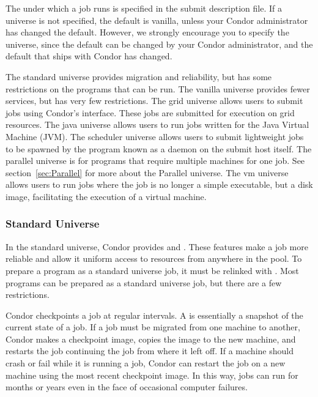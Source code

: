 The  under which a job runs
is specified in the submit description file.
If a universe is not specified,
the default is vanilla,
unless your Condor administrator has changed the default.
However, we strongly encourage you to specify the universe,
since the default can be changed by your Condor administrator,
and the default that ships with Condor has changed.

The standard universe provides migration and reliability, but has some
restrictions on the programs that can be run. 
The vanilla universe provides fewer services, but has very few
restrictions.
The grid universe allows users to submit 
jobs using Condor's interface.
These jobs are submitted for execution on grid resources.
The java universe allows users to run jobs written for the
Java Virtual Machine (JVM).
The scheduler universe allows users to submit lightweight jobs
to be spawned by the program known as a daemon on the submit host itself.
The parallel universe is for programs that require multiple machines
for one job.
See section~\ref{sec:Parallel} for more about the Parallel universe.
The vm universe allows users to run jobs where the job is
no longer a simple executable, but a disk image, facilitating
the execution of a virtual machine.

\subsubsection{\label{sec:standard-universe}Standard Universe}

In the standard universe, Condor provides  and
.  These features make a job more reliable
and allow it uniform access to resources from anywhere in the pool.
To prepare a program as a standard universe job, it must be relinked
with .  Most programs can be prepared as a standard
universe job, but there are a few restrictions.

Condor checkpoints a job at regular intervals.
A  is essentially a snapshot of the current
state of a job. 
If a job must be migrated from one machine to another,
Condor makes a checkpoint image, copies the image to the new machine,
and restarts the job continuing the job from where it left off.
If a machine should
crash or fail while it is running a job, Condor can restart the job on
a new machine using the most recent checkpoint image.
In this way, jobs
can run for months or years even in the face of occasional computer failures.

